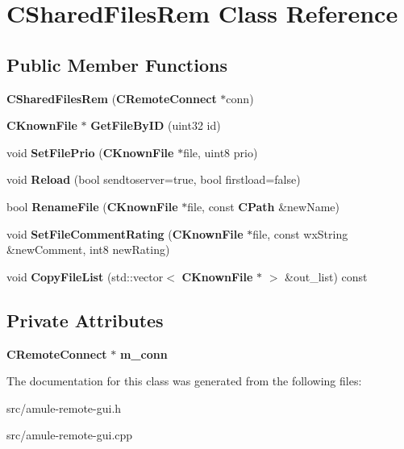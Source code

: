\section{CSharedFilesRem Class Reference}
\label{classCSharedFilesRem}
\subsection*{Public Member Functions}
\begin{DoxyCompactItemize}
\item 
{\bfseries CSharedFilesRem} ({\bf CRemoteConnect} $\ast$conn)\label{classCSharedFilesRem_a2bd8d0faf792d9d4cfdf0d9ea9601de3}

\item 
{\bf CKnownFile} $\ast$ {\bfseries GetFileByID} (uint32 id)\label{classCSharedFilesRem_a5bfbb7a410f3663100aeaad4c85c0d2a}

\item 
void {\bfseries SetFilePrio} ({\bf CKnownFile} $\ast$file, uint8 prio)\label{classCSharedFilesRem_a98dcb943cd98582a6fad4709af6d145e}

\item 
void {\bfseries Reload} (bool sendtoserver=true, bool firstload=false)\label{classCSharedFilesRem_a91b42cdcf5056f94eed45437f7c8494f}

\item 
bool {\bfseries RenameFile} ({\bf CKnownFile} $\ast$file, const {\bf CPath} \&newName)\label{classCSharedFilesRem_a30a767b41917afb8857c35d3d569b694}

\item 
void {\bfseries SetFileCommentRating} ({\bf CKnownFile} $\ast$file, const wxString \&newComment, int8 newRating)\label{classCSharedFilesRem_add0aedd5aa7d80836a32bd7195ae3799}

\item 
void {\bfseries CopyFileList} (std::vector$<$ {\bf CKnownFile} $\ast$ $>$ \&out\_\-list) const \label{classCSharedFilesRem_af7077e90532e4cc7535f46f21d866b50}

\end{DoxyCompactItemize}
\subsection*{Private Attributes}
\begin{DoxyCompactItemize}
\item 
{\bf CRemoteConnect} $\ast$ {\bfseries m\_\-conn}\label{classCSharedFilesRem_a1b7a08a646f8200ecf20301a8076bed8}

\end{DoxyCompactItemize}


The documentation for this class was generated from the following files:\begin{DoxyCompactItemize}
\item 
src/amule-\/remote-\/gui.h\item 
src/amule-\/remote-\/gui.cpp\end{DoxyCompactItemize}
